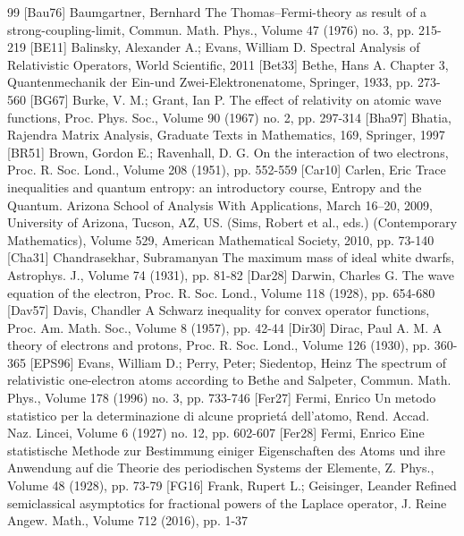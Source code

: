 \begin{thebibliography}{99}
 [Bau76] Baumgartner, Bernhard The Thomas–Fermi-theory as result of a strong-coupling-limit, Commun. Math. Phys., Volume 47 (1976) no. 3, pp. 215-219
 [BE11] Balinsky, Alexander A.; Evans, William D. Spectral Analysis of Relativistic Operators, World Scientific, 2011
 [Bet33] Bethe, Hans A. Chapter 3, Quantenmechanik der Ein-und Zwei-Elektronenatome, Springer, 1933, pp. 273-560
 [BG67] Burke, V. M.; Grant, Ian P. The effect of relativity on atomic wave functions, Proc. Phys. Soc., Volume 90 (1967) no. 2, pp. 297-314
 [Bha97] Bhatia, Rajendra Matrix Analysis, Graduate Texts in Mathematics, 169, Springer, 1997
 [BR51] Brown, Gordon E.; Ravenhall, D. G. On the interaction of two electrons, Proc. R. Soc. Lond., Volume 208 (1951), pp. 552-559
 [Car10] Carlen, Eric Trace inequalities and quantum entropy: an introductory course, Entropy and the Quantum. Arizona School of Analysis With Applications, March 16–20, 2009, University of Arizona, Tucson, AZ, US. (Sims, Robert et al., eds.) (Contemporary Mathematics), Volume 529, American Mathematical Society, 2010, pp. 73-140
 [Cha31] Chandrasekhar, Subramanyan The maximum mass of ideal white dwarfs, Astrophys. J., Volume 74 (1931), pp. 81-82
 [Dar28] Darwin, Charles G. The wave equation of the electron, Proc. R. Soc. Lond., Volume 118 (1928), pp. 654-680
 [Dav57] Davis, Chandler A Schwarz inequality for convex operator functions, Proc. Am. Math. Soc., Volume 8 (1957), pp. 42-44
 [Dir30] Dirac, Paul A. M. A theory of electrons and protons, Proc. R. Soc. Lond., Volume 126 (1930), pp. 360-365
 [EPS96] Evans, William D.; Perry, Peter; Siedentop, Heinz The spectrum of relativistic one-electron atoms according to Bethe and Salpeter, Commun. Math. Phys., Volume 178 (1996) no. 3, pp. 733-746
 [Fer27] Fermi, Enrico Un metodo statistico per la determinazione di alcune proprietá dell’atomo, Rend. Accad. Naz. Lincei, Volume 6 (1927) no. 12, pp. 602-607
 [Fer28] Fermi, Enrico Eine statistische Methode zur Bestimmung einiger Eigenschaften des Atoms und ihre Anwendung auf die Theorie des periodischen Systems der Elemente, Z. Phys., Volume 48 (1928), pp. 73-79
 [FG16] Frank, Rupert L.; Geisinger, Leander Refined semiclassical asymptotics for fractional powers of the Laplace operator, J. Reine Angew. Math., Volume 712 (2016), pp. 1-37

\end{thebibliography}
